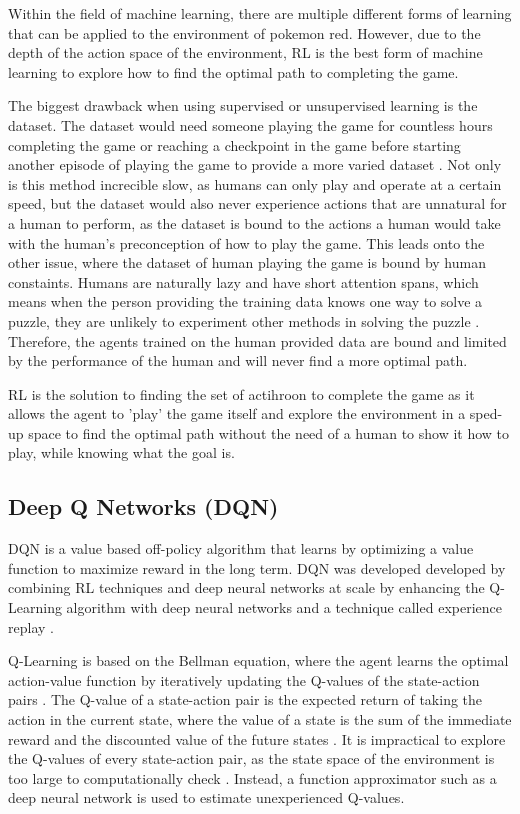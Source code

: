 Within the field of machine learning, there are multiple different forms of learning that can be applied to the environment of pokemon red. However, due to the depth of the action space of the environment, RL is the best form of machine learning to explore how to find the optimal path to completing the game. 

The biggest drawback when using supervised or unsupervised learning is the dataset. The dataset would need someone playing the game for countless hours completing the game or reaching a checkpoint in the game before starting another episode of playing the game to provide a more varied dataset \cite{XanderSteenbrugge2019intro}. Not only is this method increcible slow, as humans can only play and operate at a certain speed, but the dataset would also never experience actions that are unnatural for a human to perform, as the dataset is bound to the actions a human would take with the human's preconception of how to play the game. This leads onto the other issue, where the dataset of human playing the game is bound by human constaints. Humans are naturally lazy and have short attention spans, which means when the person providing the training data knows one way to solve a puzzle, they are unlikely to experiment other methods in solving the puzzle \cite{XanderSteenbrugge2019intro}. Therefore, the agents trained on the human provided data are bound and limited by the performance of the human and will never find a more optimal path. 

RL is the solution to finding the set of actihroon to complete the game as it allows the agent to 'play' the game itself and explore the environment in a sped-up space to find the optimal path without the need of a human to show it how to play, while knowing what the goal is. 

\subsection{Deep Q Networks (DQN)}

DQN is a value based off-policy algorithm that learns by optimizing a value function to maximize reward in the long term. DQN was developed developed by combining RL techniques and deep neural networks at scale by enhancing the Q-Learning algorithm with deep neural networks and a technique called experience replay \cite{TFAgentsAuthors2023}.

Q-Learning is based on the Bellman equation, where the agent learns the optimal action-value function by iteratively updating the Q-values of the state-action pairs \cite{mnih2013playing}. The Q-value of a state-action pair is the expected return of taking the action in the current state, where the value of a state is the sum of the immediate reward and the discounted value of the future states \cite{bellman1958dynamic}. It is impractical to explore the Q-values of every state-action pair, as the state space of the environment is too large to computationally check \cite{mnih2013playing}. Instead, a function approximator such as a deep neural network is used to estimate unexperienced Q-values. 

